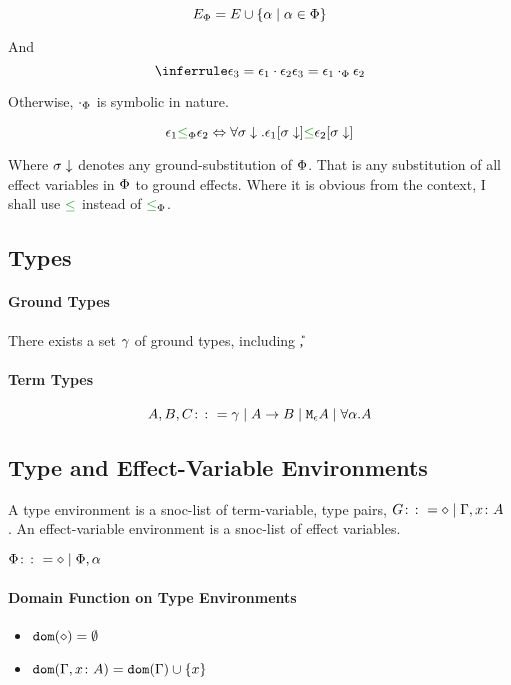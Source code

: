 \documentclass{report}
\begin{document}
\begin{equation}
    E_\P = E \cup \left\{\a \mid \a \in \P \right\}
\end{equation}

And 
\begin{equation}
    \treeruleI{\e_3 = \e_1\dot\e_2}{\e_3 = \e_1\dotp\e_2}
\end{equation}

Otherwise, $\dotp$ is symbolic in nature.

\begin{equation}
    \e_1 \subeffectp \e_2 \Leftrightarrow \forall \si\downarrow. \e_1\sub{\si\downarrow} \subeffect \e_2\sub{\si\downarrow}
\end{equation}

Where $\si\downarrow$ denotes any ground-substitution of $\P$. That is any substitution of all effect variables in $\P$ to ground effects. Where it is obvious from the context, I shall use $\subeffect$ instead of $\subeffectp$.


\subsection{Types}
    \paragraph{Ground Types}
        There exists a set $\ground$ of ground types, including \U, \B
    \paragraph{Term Types}
    $$ A, B, C \gens \ground \mid \ab \mid \mea \mid \all{\a}{A}$$
  
\subsection{Type and Effect-Variable Environments}
A type environment is a snoc-list of term-variable, type pairs, $G \gens \nil \mid \gax$ .
An effect-variable environment is a snoc-list of effect variables.

$\P\gens\nil\mid\P, \a$
\paragraph{Domain Function on Type Environments}
\begin{itemize}
    \item $\dom{\nil} = \emptyset$
    \item $\dom{\gax} =  \dom{\G}  \cup \left\{x \right\}$
\end{itemize}
\end{document}
